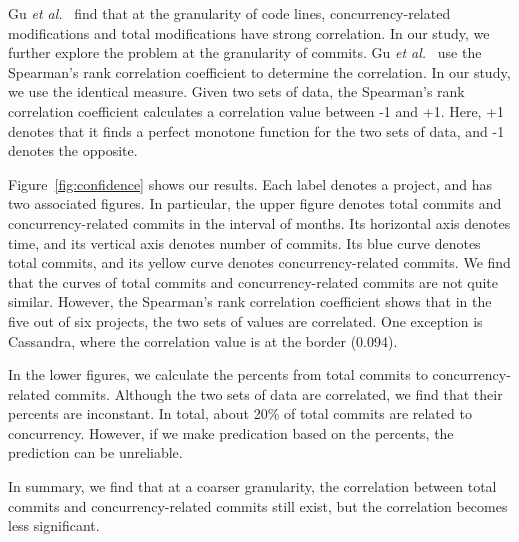 Gu \emph{et al.}~\cite{conf/sigsoft/GuJSZL15} find that at the granularity of code lines, concurrency-related modifications and total modifications have strong correlation. In our study, we further explore the problem at the granularity of commits. Gu \emph{et al.}~\cite{conf/sigsoft/GuJSZL15} use the Spearman's rank
correlation coefficient to determine the correlation. In our study, we use the identical measure. Given two sets of data, the Spearman's rank
correlation coefficient calculates a correlation value between -1 and +1. Here, +1 denotes that it finds a perfect monotone function for the two sets of data, and -1 denotes the opposite. 
 
Figure~\ref{fig:confidence} shows our results. Each label denotes a project, and has two associated figures. In particular, the upper figure denotes total commits and concurrency-related commits in the interval of months. Its horizontal axis denotes time, and its vertical axis denotes number of commits. Its blue curve denotes total commits, and its yellow curve denotes concurrency-related commits. We find that the curves of total commits and concurrency-related commits are not quite similar. However, the Spearman's rank
correlation coefficient shows that in the five out of six projects, the two sets of values are correlated. One exception is Cassandra, where the correlation value is at the border (0.094).

In the lower figures, we calculate the percents from total commits to concurrency-related commits. Although the two sets of data are correlated, we find that their percents are inconstant. In total, about 20\% of total commits are related to concurrency. However, if we make predication based on the percents, the prediction can be unreliable.

In summary, we find that at a coarser granularity, the correlation between total commits and concurrency-related commits still exist, but the correlation becomes less significant.  





